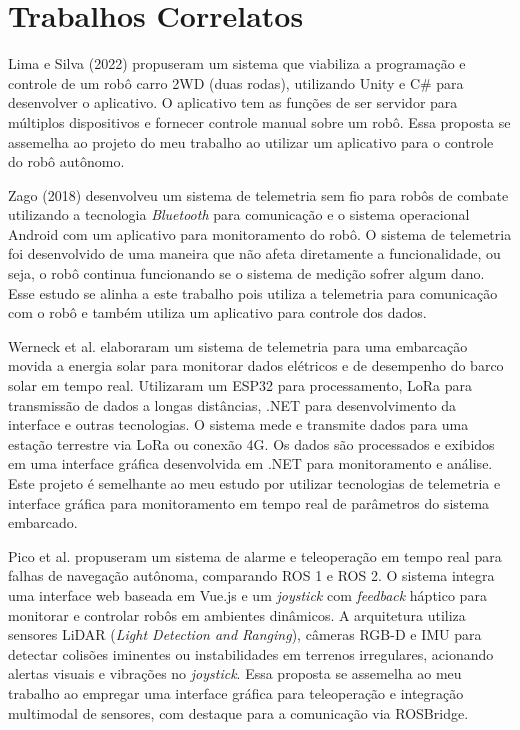\section{Trabalhos Correlatos}
\label{sec:trabalhos}


Lima e Silva (2022) \cite{robo2wd} propuseram um sistema que viabiliza a programação e controle de um robô carro 2WD (duas rodas), utilizando Unity e C\# para desenvolver o aplicativo. O aplicativo tem as funções de ser servidor para múltiplos dispositivos e fornecer controle manual sobre um robô. Essa proposta se assemelha ao projeto do meu trabalho ao utilizar um aplicativo para o controle do robô autônomo.

Zago (2018) \cite{TelemetriaCompeticao} desenvolveu um sistema de telemetria sem fio para robôs de combate utilizando a tecnologia \textit{Bluetooth} para comunicação e o sistema operacional Android com um aplicativo para monitoramento do robô. O sistema de telemetria foi desenvolvido de uma maneira que não afeta diretamente  a funcionalidade, ou seja, o robô continua funcionando se o sistema de medição sofrer algum dano. Esse estudo se alinha a este trabalho pois utiliza a telemetria para comunicação com o robô e também utiliza um aplicativo para controle dos dados.

Werneck et al. \cite{TelemetriaSolar} elaboraram um sistema de telemetria para uma embarcação movida a energia solar para monitorar dados elétricos e de desempenho do barco solar em tempo real. Utilizaram um ESP32 para processamento, LoRa para transmissão de dados a longas distâncias, .NET para desenvolvimento da interface e outras tecnologias. O sistema mede e transmite dados para uma estação terrestre via LoRa ou conexão 4G. Os dados são processados e exibidos em uma interface gráfica desenvolvida em .NET para monitoramento e análise. Este projeto é semelhante ao meu estudo por utilizar tecnologias de telemetria e interface gráfica para monitoramento em tempo real de parâmetros do sistema embarcado.

Pico et al. \cite{Teleoperacao} propuseram um sistema de alarme e teleoperação em tempo real para falhas de navegação autônoma, comparando ROS 1 e ROS 2. O sistema integra uma interface web baseada em Vue.js e um \textit{joystick} com \textit{feedback} háptico para monitorar e controlar robôs em ambientes dinâmicos. A arquitetura utiliza sensores LiDAR (\textit{Light Detection and Ranging}), câmeras RGB-D e IMU para detectar colisões iminentes ou instabilidades em terrenos irregulares, acionando alertas visuais e vibrações no \textit{joystick}. Essa proposta se assemelha ao meu trabalho ao empregar uma interface gráfica para teleoperação e integração multimodal de sensores, com destaque para a comunicação via ROSBridge.

